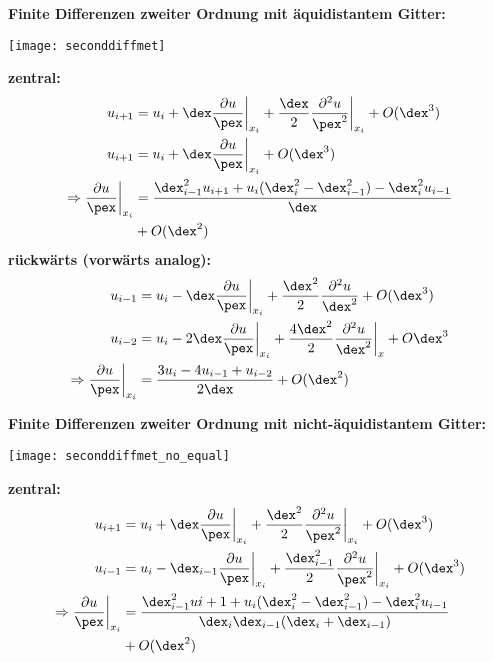 \textbf{Finite Differenzen zweiter Ordnung mit \"aquidistantem Gitter:}
\begin{multicols}{2}
\vspace{-2em}
\texttt{[image: seconddiffmet]}

\vfill\null
\columnbreak

\textbf{zentral:}
\vspace{-1.5em}
\begin{align*} 
	u_{i+1} &= u_i + \dex\frac{\partial u}{\pex}\bigg|_{x_i} + \frac{\dex}{2}\frac{\partial^2 u}{\pex^2}\bigg|_{x_i} + O(\dex^3) \\
	u_{i+1} &= u_i + \dex\frac{\partial u}{\pex}\bigg|_{x_i} + O(\dex^3) \\
	\Rightarrow \frac{\partial u}{\pex}\bigg|_{x_i} &= \frac{\dex^2_{i-1} u_{i+1} + u_i (\dex^2_i - \dex^2_{i-1}) - \dex^2_i u_{i-1}}{\dex} \\ &+ O(\dex^2)
\end{align*}
\vspace{-1em}
\textbf{r\"uckw\"arts (vorw\"arts analog):}
\begin{align*} 
	u_{i-1} &= u_i - \dex\frac{\partial u}{\pex}\bigg|_{x_i} + \frac{\dex^2}{2}\frac{\partial^2u}{\dex^2} + O(\dex^3) \\
	u_{i-2} &= u_i - 2\dex\frac{\partial u}{\pex}\bigg|_{x_i} + \frac{4\dex^2}{2}\frac{\partial^2 u}{\dex^2}\bigg|_{x} + O{\dex^3}\\
	\Rightarrow \frac{\partial u}{\pex}\bigg|_{x_i} &= \frac{3u_{i} - 4u_{i-1} + u_{i-2}}{2\dex} + O(\dex^2)
\end{align*}

\end{multicols}



\textbf{Finite Differenzen zweiter Ordnung mit nicht-\"aquidistantem Gitter:}
\begin{multicols}{2}
\vspace{-2em}
\texttt{[image: seconddiffmet\_no\_equal]}

\vfill\null
\columnbreak

\textbf{zentral:}
\vspace{-1.5em}
\begin{align*} 
	u_{i+1} &= u_i + \dex\frac{\partial u}{\pex}\bigg|_{x_i} + \frac{\dex^2}{2}\frac{\partial^2 u}{\pex^2}\bigg|_{x_i} + O(\dex^3) \\
	u_{i-1} &= u_i - \dex_{i-1}\frac{\partial u}{\pex}\bigg|_{x_i} + \frac{\dex^2_{i-1}}{2}\frac{\partial^2 u}{\pex^2}\bigg|_{x_i} + O(\dex^3)\\
	\Rightarrow \frac{\partial u}{\pex}\bigg|_{x_i} &= \frac{\dex^2_{i-1}u{i+1} + u_i(\dex^2_i - \dex^2_{i-1}) - \dex^2_i u_{i-1}}{\dex_i \dex_{i-1} (\dex_i + \dex_{i-1})}\\
	&+ O(\dex^2)
\end{align*}

\end{multicols}

